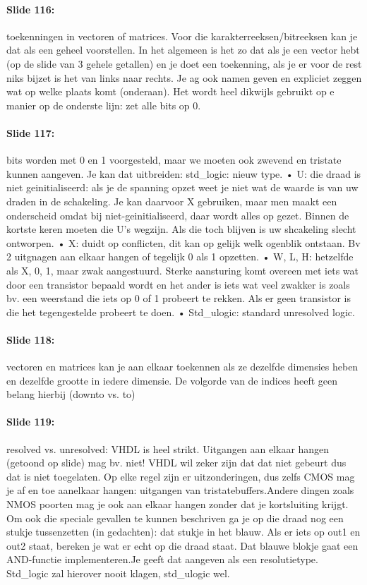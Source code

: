 \documentclass[10pt,a4paper]{book}
\begin{document}
\paragraph{Slide 116:} toekenningen in vectoren of matrices. Voor die karakterreeksen/bitreeksen kan je dat als een geheel voorstellen. In het algemeen is het zo dat als je een vector hebt (op de slide van 3 gehele getallen) en je doet een toekenning, als je er voor de rest niks bijzet is het van links naar rechts. Je ag ook namen geven en expliciet zeggen wat op welke plaats komt (onderaan).   Het wordt heel dikwijls gebruikt op e manier op de onderste lijn: zet alle bits op 0. 

\paragraph{Slide 117:} bits worden met 0 en 1 voorgesteld, maar we moeten ook zwevend en tristate kunnen aangeven. Je kan dat uitbreiden: std\_logic: nieuw type. 	• U: die draad is niet geinitialiseerd: als je de spanning opzet weet je niet wat de waarde is van uw draden in de schakeling. Je kan daarvoor X gebruiken, maar men maakt een onderscheid omdat bij niet-geinitialiseerd, daar wordt alles op gezet. Binnen de kortste keren moeten die U's wegzijn. Als die toch blijven is uw shcakeling slecht ontworpen.	• X: duidt op conflicten, dit kan op gelijk welk ogenblik ontstaan. Bv 2 uitgnagen aan elkaar hangen of tegelijk 0 als 1 opzetten. 	• W, L, H: hetzelfde als X, 0, 1, maar zwak aangestuurd. Sterke aansturing komt overeen met iets wat door een transistor bepaald wordt en het ander is iets wat veel zwakker is zoals bv. een weerstand die iets op 0 of 1 probeert te rekken. Als er geen transistor is die het tegengestelde probeert te doen.	• Std\_ulogic: standard unresolved logic.

\paragraph{Slide 118:} vectoren en matrices kan je aan elkaar toekennen als ze dezelfde dimensies heben en dezelfde grootte in iedere dimensie. De volgorde van de indices heeft geen belang hierbij (downto vs. to)

\paragraph{Slide 119:} resolved vs. unresolved: VHDL is heel strikt. Uitgangen aan elkaar hangen (getoond op slide) mag bv. niet! VHDL wil zeker zijn dat dat niet gebeurt dus dat is niet toegelaten. Op elke regel zijn er uitzonderingen, dus zelfs CMOS mag je af en toe aanelkaar hangen: uitgangen van tristatebuffers.Andere dingen zoals NMOS poorten mag je ook aan elkaar hangen zonder dat je kortsluiting krijgt. Om ook die speciale gevallen te kunnen beschriven ga je op die draad nog een stukje tussenzetten (in gedachten): dat stukje in het blauw. Als er iets op out1 en out2 staat, bereken je wat er echt op die draad staat. Dat blauwe blokje gaat een AND-functie implementeren.Je geeft dat aangeven als een resolutietype. Std\_logic zal hierover nooit klagen, std\_ulogic wel.
\end{document}
